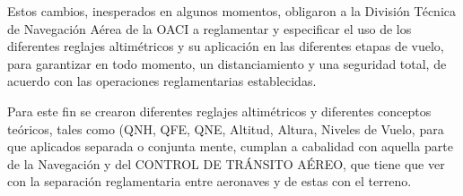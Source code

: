 \documentclass[a4paper,12pt,twoside]{article}
\begin{document}



Estos cambios, inesperados en algunos momentos, obligaron a la Divisi\'on
Técnica de Navegaci\'on Aérea de la OACI a reglamentar y especificar el uso de los
diferentes reglajes altimétricos y su aplicaci\'on en las diferentes etapas de vuelo, para
garantizar en todo momento, un distanciamiento y una seguridad total, de acuerdo con las
operaciones reglamentarias establecidas.

Para este fin se crearon diferentes reglajes altimétricos y diferentes conceptos te\'oricos, tales
como (QNH, QFE, QNE, Altitud, Altura, Niveles de Vuelo, para que aplicados separada o
conjunta mente, cumplan a cabalidad con aquella parte de la Navegaci\'on y del CONTROL
DE TRÁNSITO AÉREO, que tiene que ver con la separaci\'on reglamentaria entre
aeronaves y de estas con el terreno.


\end{document}
